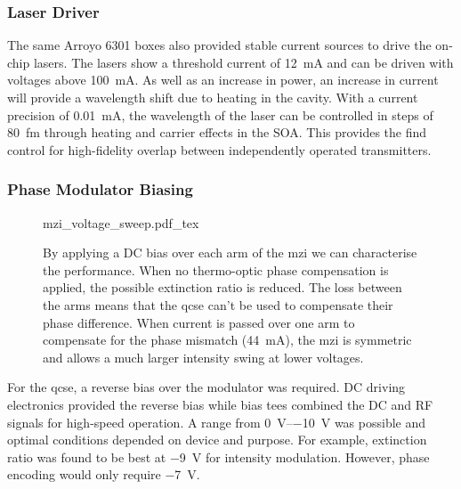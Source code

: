 \subsubsection{Laser Driver}

The same Arroyo 6301 boxes also provided stable current sources to drive the on-chip lasers. The lasers show a threshold current of \SI{12}{mA} and can be driven with voltages above \SI{100}{mA}. As well as an increase in power, an increase in current will provide a wavelength shift due to heating in the cavity. With a current precision of \SI{0.01}{mA}, the wavelength of the laser can be controlled in steps of \SI{80}{fm} through heating and carrier effects in the \ac{SOA}. This provides the find control for high-fidelity overlap between independently operated transmitters. 

\subsubsection{Phase Modulator Biasing}

\begin{figure}[t]
	\centering
	\def\svgwidth{\textwidth} 
	{mzi_voltage_sweep.pdf_tex}
	\caption[MZI calibration through thermo-optic modulation]{By applying a DC bias over each arm of the \ac{mzi} we can characterise the performance. When no thermo-optic phase compensation is applied, the possible extinction ratio is reduced. The loss between the arms means that the \ac{qcse} can't be used to compensate their phase difference. When current is passed over one arm to compensate for the phase mismatch (\SI{44}{\mA}), the \acs{mzi} is symmetric and allows a much larger intensity swing at lower voltages.}
	\label{fig:mzi_cal}
\end{figure}

For the \ac{qcse}, a reverse bias over the modulator was required. DC driving electronics provided the reverse bias while bias tees combined the DC and RF signals for high-speed operation. A range from \SIrange{0}{-10}{\V} was possible and optimal conditions depended on device and purpose. For example, extinction ratio was found to be best at \SI{-9}{\V} for intensity modulation. However, phase encoding would only require \SI{-7}{\V}.



